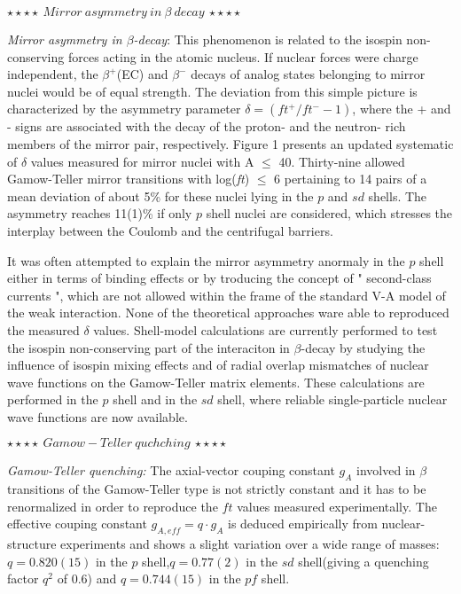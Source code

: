 \documentclass[UTF8]{ctexart}
\begin{document}
$\star\star\star\star~Mirror~asymmetry~in~\beta~decay~\star\star\star\star$

\textit{Mirror asymmetry in $\beta$-decay}: This phenomenon is related to the isospin non-conserving forces acting in the atomic nucleus. If nuclear forces were charge independent, the $\beta^{+}$(EC) and $\beta^{-}$ decays of analog states belonging to mirror nuclei would be of equal strength. The deviation from this simple picture is characterized by the asymmetry parameter $\delta=\left( ft^{+}/ft^{-}-1 \right)$, where the + and - signs are associated with the decay of the proton- and the neutron- rich members of the mirror pair, respectively. Figure 1 presents an updated systematic of $\delta$ values measured for mirror nuclei with A $\leq$ 40. Thirty-nine allowed Gamow-Teller mirror transitions with log(\textit{ft}) $\leq$ 6 pertaining to 14 pairs of a mean deviation of about 5\% for these nuclei lying in the $p$ and $sd$ shells. The asymmetry reaches 11(1)\% if only $p$ shell nuclei are considered, which stresses the interplay between the Coulomb and the centrifugal barriers.

It was often attempted to explain the mirror asymmetry anormaly in the $p$ shell either in terms of binding effects or by troducing the concept of " second-class currents ", which are not allowed within the frame of the standard V-A model of the weak interaction. None of the theoretical approaches ware able to reproduced the measured $\delta$ values. Shell-model calculations are currently performed to test the isospin non-conserving part of the interaciton in $\beta$-decay by studying the influence of isospin mixing effects and of radial overlap mismatches of nuclear wave functions on the Gamow-Teller matrix elements. These calculations are performed in the $p$ shell and in the $sd$ shell, where reliable single-particle nuclear wave functions are now available.


$\star\star\star\star~Gamow-Teller~quchching~\star\star\star\star$

\textit{Gamow-Teller quenching:} The axial-vector couping constant $g_{A}$ involved in $\beta$ transitions of the Gamow-Teller type is not strictly constant and it has to be renormalized in order to reproduce the $ft$ values measured experimentally. The effective couping constant $g_{A,eff}=q\cdot g_{A}$ is deduced empirically from nuclear-structure experiments and shows a slight variation over a wide range of masses: $q=0.820(15)$ in the $p$ shell,$q=0.77(2)$ in the $sd$ shell(giving a quenching factor $q^{2}$ of 0.6) and $q=0.744(15)$ in the $pf$ shell.
\end{document}
